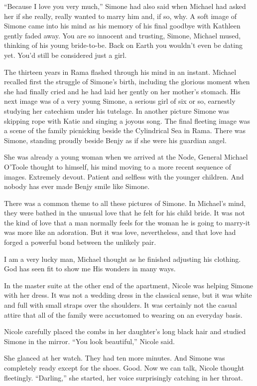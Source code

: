 \documentclass[]{article}
\begin{document}
{“Because I love you very much,” Simone had also said when Michael had asked her if she really, really wanted to marry him and, if so, why. A soft image of Simone came into his mind as his memory of his final goodbye with Kathleen gently faded away. You are so innocent and trusting, Simone, Michael mused, thinking of his young bride-to-be. Back on Earth you wouldn’t even be dating yet. You’d still be considered just a girl.

The thirteen years in Rama flashed through his mind in an instant. Michael recalled first the struggle of Simone’s birth, including the glorious moment when she had finally cried and he had laid her gently on her mother’s stomach. His next image was of a very young Simone, a serious girl of six or so, earnestly studying her catechism under his tutelage. In another picture Simone was skipping rope with Katie and singing a joyous song. The final fleeting image was a scene of the family picnicking beside the Cylindrical Sea in Rama. There was Simone, standing proudly beside Benjy as if she were his guardian angel.

She was already a young woman when we arrived at the Node, General Michael O’Toole thought to himself, his mind moving to a more recent sequence of images. Extremely devout. Patient and selfless with the younger children. And nobody has ever made Benjy smile like Simone.

There was a common theme to all these pictures of Simone. In Michael’s mind, they were bathed in the unusual love that he felt for his child bride. It was not the kind of love that a man normally feels for the woman he is going to marry-it was more like an adoration. But it was love, nevertheless, and that love had forged a powerful bond between the unlikely pair.

I am a very lucky man, Michael thought as he finished adjusting his clothing. God has seen fit to show me His wonders in many ways.

In the master suite at the other end of the apartment, Nicole was helping Simone with her dress. It was not a wedding dress in the classical sense, but it was white and full with small straps over the shoulders. It was certainly not the casual attire that all of the family were accustomed to wearing on an everyday basis.

Nicole carefully placed the combs in her daughter’s long black hair and studied Simone in the mirror. “You look beautiful,” Nicole said.

She glanced at her watch. They had ten more minutes. And Simone was completely ready except for the shoes. Good. Now we can talk, Nicole thought fleetingly. “Darling,” she started, her voice surprisingly catching in her throat.

}
\end{document}
